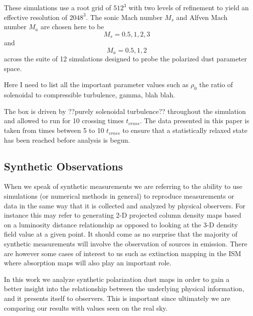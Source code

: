 These simulations use a root grid of $512^{3}$ with two levels of refinement to
yield an effective resolution of $2048^{3}$. The sonic Mach number $M_{s}$ and
Alfven Mach number $M_{a}$ are chosen here to be $$M_{s} = 0.5, 1, 2, 3$$ and
$$M_{a} = 0.5, 1, 2$$ across the suite of 12 simulations designed to probe the
polarized dust parameter space.

Here I need to list all the important parameter values such as $\rho_0$ the
ratio of solenoidal to compressible turbulence, gamma, blah blah.

The box is driven by ??purely solenoidal turbulence?? throughout the simulation and
allowed to run for 10 crossing times $t_{cross}$. The data presented in this
paper is taken from times between 5 to 10 $t_{cross}$ to ensure that a
statistically relaxed state has been reached before analysis is begun.

\subsection{Synthetic Observations}

When we speak of synthetic measurements we are referring to the ability to
use simulations (or numerical methods in general) to reproduce measurements or
data in the same way that it is collected and analyzed by physical observers.
For instance this may refer to generating 2-D projected column density maps
based on a luminosity distance relationship as opposed to looking at the 3-D
density field value at a given point. It should come as no surprise that the
majority of synthetic measurements will involve the observation of sources in
emission. There are however some cases of interest to us such as extinction
mapping in the ISM where absorption maps will also play an important role.

In this work we analyze synthetic polarization dust maps in order to gain a
better insight into the relationship between the underlying physical
information, and it presents itself to observers. This is important since
ultimately we are comparing our results with values seen on the real sky.
